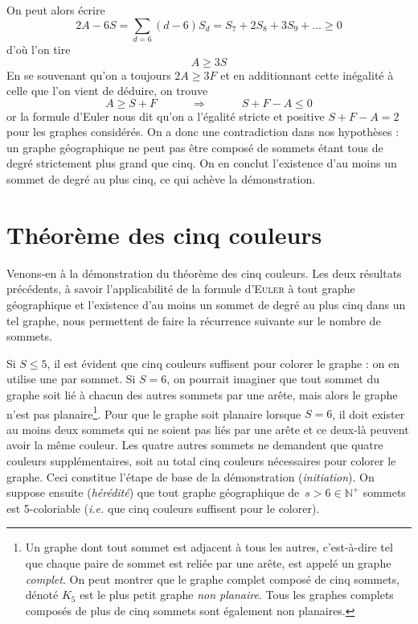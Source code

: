 \documentclass[french]{report}
\begin{document}
On peut alors écrire $$2A-6S=\sum\limits_{d=6}(d-6)S_d=S_7+2S_8+3S_9+...\geqslant 0$$ d'où l'on tire $$A\geqslant 3S$$ En se souvenant qu'on a toujours $2A\geqslant 3F$ et en additionnant cette inégalité à celle que l'on vient de déduire, on trouve $$A\geqslant S+F\quad\qquad\Rightarrow\quad\qquad S+F-A\leqslant 0$$ or la formule d'Euler nous dit qu'on a l'égalité stricte et positive $S+F-A=2$ pour les graphes considérés. On a donc une contradiction dans nos hypothèses : un graphe géographique ne peut pas être composé de sommets étant tous de degré strictement plus grand que cinq. On en conclut l'existence d'au moins un sommet de degré au plus cinq, ce qui achève la démonstration.\\

\section{Théorème des cinq couleurs}

Venons-en à la démonstration du théorème des cinq couleurs. Les deux résultats précédents, à savoir l'applicabilité de la formule d'\textsc{Euler} à tout graphe géographique et l'existence d'au moins un sommet de degré au plus cinq dans un tel graphe, nous permettent de faire la récurrence suivante sur le nombre de sommets.

Si $S\leqslant 5$, il est évident que cinq couleurs suffisent pour colorer le graphe : on en utilise une par sommet. Si $S=6$, on pourrait imaginer que tout sommet du graphe soit lié à chacun des autres sommets par une arête, mais alors le graphe n'est pas planaire\footnote{Un graphe dont tout sommet est adjacent à tous les autres, c'est-à-dire tel que chaque paire de sommet est reliée par une arête, est appelé un graphe \textit{complet}. On peut montrer que le graphe complet composé de cinq sommets, dénoté $K_5$ est le plus petit graphe \textit{non planaire}. Tous les graphes complets composés de plus de cinq sommets sont également non planaires.}. Pour que le graphe soit planaire lorsque $S=6$, il doit exister au moins deux sommets qui ne soient pas liés par une arête et ce deux-là peuvent avoir la même couleur. Les quatre autres sommets ne demandent que quatre couleurs supplémentaires, soit au total cinq couleurs nécessaires pour colorer le graphe. Ceci constitue l'étape de base de la démonstration (\textit{initiation}). On suppose ensuite (\textit{hérédité}) que tout graphe géographique de~$s>6\in\mathbb{N}^+$ sommets est 5-coloriable (\textit{i.e.} que cinq couleurs suffisent pour le colorer).
\end{document}
